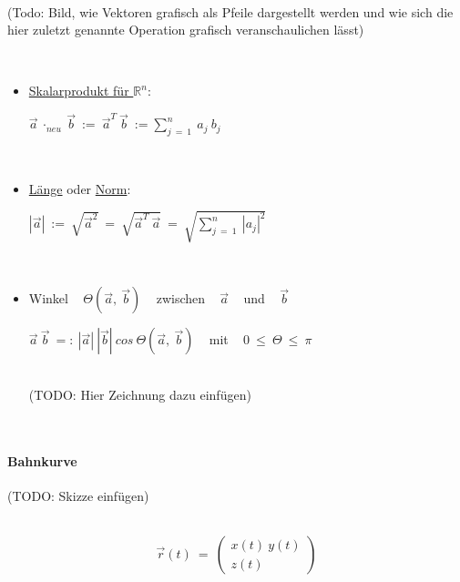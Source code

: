 \begin{flushleft}
~\\

(Todo: Bild, wie Vektoren grafisch als Pfeile dargestellt werden und wie sich die hier zuletzt genannte Operation grafisch veranschaulichen lässt)

~\\

\begin{itemize}
	
	\item \underline{Skalarprodukt für $\mathbb{R}^n$}: \hfill \break
	
	$\vec{a} ~ \cdot_{neu} ~ \vec{b} ~ := ~ \vec{a}^T ~ \vec{b} ~ := \sum_{j ~ = ~ 1}^{n} ~ a_j ~ b_j $
	
	\iec
	
	~\\
	
	\item \underline{Länge} oder \underline{Norm}: \hfill \break
	
	$ \left| \vec{a} \right| ~ := ~ \sqrt{\vec{a}^2} ~ = ~ \sqrt{\vec{a}^T ~ \vec{a}} ~ = ~ \sqrt{ \sum_{j ~ = ~ 1}^{n} ~ \left| a_j \right|^2 } $
	
	\iec
	
	~\\
	
	\item Winkel ~ $\Theta\left(\vec{a}, ~ \vec{b} \right)$ ~ zwischen ~ $\vec{a}$ ~ und ~ $\vec{b}$ \hfill \break
	
	$\vec{a} ~ \vec{b} ~ =: ~ \left| \vec{a} \right| ~ \left| \vec{b} \right| ~ cos ~ \Theta \left(\vec{a}, ~ \vec{b} \right)$ ~ mit ~ $0 ~ \leq ~ \Theta ~ \leq ~ \pi$
	
	\iec
	
	~\\
	
	(TODO: Hier Zeichnung dazu einfügen)
	
	
	
\end{itemize}


~\\

\paragraph*{Bahnkurve}

(TODO: Skizze einfügen)

~\\

\[ \vec{r}(t) ~ = ~ \left( \begin{array}{c}x(t)\ y(t)\\ z(t)\end{array} \right) \]


\end{flushleft}
